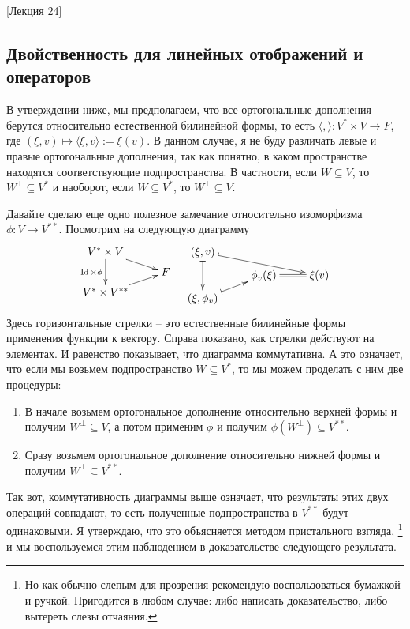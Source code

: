 [Лекция 24]


\subsection{Двойственность для линейных отображений и операторов}

В утверждении ниже, мы предполагаем, что все ортогональные дополнения берутся относительно естественной билинейной формы, то есть $\langle, \rangle\colon V^*\times V\to F$, где $(\xi, v)\mapsto \langle \xi, v\rangle := \xi(v)$.
В данном случае, я не буду различать левые и правые ортогональные дополнения, так как понятно, в каком пространстве находятся соответствующие подпространства.
В частности, если $W\subseteq V$, то $W^\bot\subseteq V^*$ и наоборот, если $W\subseteq V^*$, то $W^\bot \subseteq V$.

Давайте сделаю еще одно полезное замечание относительно изоморфизма $\phi\colon V\to V^{**}$.
Посмотрим на следующую диаграмму
\[
\xymatrix@R=5pt{
	{V^*\times V}\ar[dd]_{\Identity\times \phi}\ar[rd]&{}\\
	{}&{F}\\
	{V^*\times V^{**}}\ar[ru]&{}\\
}
\quad
\xymatrix@R=5pt{
	{(\xi, v)}\ar@{|->}[dd]\ar@{|->}[rrd]&{}&{}\\
	{}&{\phi_v(\xi)}\ar@{=}[r]&{\xi(v)}\\
	{(\xi,\phi_v)}\ar@{|->}[ru]&{}&{}\\
}
\]
Здесь горизонтальные стрелки -- это естественные билинейные формы применения функции к вектору.
Справа показано, как стрелки действуют на элементах.
И равенство показывает, что диаграмма коммутативна.
А это означает, что если мы возьмем подпространство $W\subseteq V^*$, то мы можем проделать с ним две процедуры: 
\begin{enumerate}
\item В начале возьмем ортогональное дополнение относительно верхней формы и получим $W^\bot \subseteq V$, а потом применим $\phi$ и получим $\phi(W^\bot)\subseteq V^{**}$.

\item Сразу возьмем ортогональное дополнение относительно нижней формы и получим $W^\bot \subseteq V^{**}$.
\end{enumerate}
Так вот, коммутативность диаграммы выше означает, что результаты этих двух операций совпадают, то есть полученные подпространства в $V^{**}$ будут одинаковыми.
Я утверждаю, что это объясняется методом пристального взгляда,%
\footnote{Но как обычно слепым для прозрения рекомендую воспользоваться бумажкой и ручкой.
Пригодится в любом случае: либо написать доказательство, либо вытереть слезы отчаяния.}
и мы воспользуемся этим наблюдением в доказательстве следующего результата.

